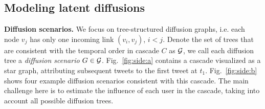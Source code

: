 


\subsection{Modeling latent diffusions}
\label{subsec:model-latent-diffusions}

\noindent\textbf{Diffusion scenarios.}
We focus on tree-structured diffusion graphs, i.e. each node $v_j$ has only one incoming link $(v_i, v_j)$, $i<j$. 
Denote the set of trees that are consistent with the temporal order in cascade $C$ as ${\cal G}$, we call each diffusion tree a \emph{diffusion scenario} $G \in {\cal G}$.
Fig.~\ref{fig:side:a} contains a cascade visualized as a star graph, attributing subsequent tweets to the first tweet at $t_1$.
Fig.~\ref{fig:side:b} shows four example diffusion scenarios consistent with this cascade.
The main challenge here is to estimate the influence of each user in the cascade, taking into account all possible diffusion trees.

